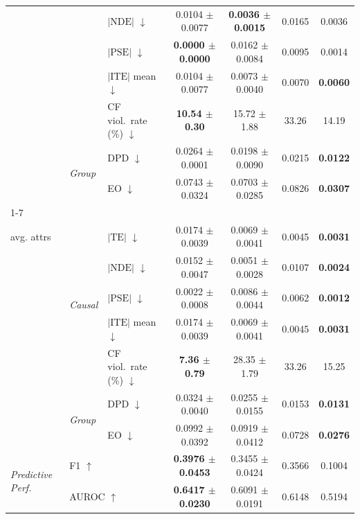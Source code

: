 \begin{table}[t]
\begin{tabular}{@{}lll cccc@{}}
  & & $|\mathrm{NDE}|$ $\downarrow$ & 0.0104 $\pm$ 0.0077 & \textbf{0.0036 $\pm$ 0.0015} & 0.0165 & 0.0036 \\
  & & $|\mathrm{PSE}|$ $\downarrow$ & \textbf{0.0000 $\pm$ 0.0000} & 0.0162 $\pm$ 0.0084 & 0.0095 & 0.0014 \\
  & & $|\mathrm{ITE}|$ mean $\downarrow$ & 0.0104 $\pm$ 0.0077 & 0.0073 $\pm$ 0.0040 & 0.0070 & \textbf{0.0060} \\
  & & CF viol.\ rate (\%) $\downarrow$ & \textbf{10.54 $\pm$ 0.30} & 15.72 $\pm$ 1.88 & 33.26 & 14.19 \\
  & \multirow{2}{*}{\scriptsize\textit{Group}} & DPD $\downarrow$ & 0.0264 $\pm$ 0.0001 & 0.0198 $\pm$ 0.0090 & 0.0215 & \textbf{0.0122} \\
  & & EO $\downarrow$ & 0.0743 $\pm$ 0.0324 & 0.0703 $\pm$ 0.0285 & 0.0826 & \textbf{0.0307} \\
\cmidrule(lr){1-7}
  \multirow{7}{*}{\makecell[l]{\textit{Overall}\\[-2pt]\scriptsize avg. attrs}} & \multirow{5}{*}{\scriptsize\textit{Causal}} & $|\mathrm{TE}|$ $\downarrow$ & 0.0174 $\pm$ 0.0039 & 0.0069 $\pm$ 0.0041 & 0.0045 & \textbf{0.0031} \\
  & & $|\mathrm{NDE}|$ $\downarrow$ & 0.0152 $\pm$ 0.0047 & 0.0051 $\pm$ 0.0028 & 0.0107 & \textbf{0.0024} \\
  & & $|\mathrm{PSE}|$ $\downarrow$ & 0.0022 $\pm$ 0.0008 & 0.0086 $\pm$ 0.0044 & 0.0062 & \textbf{0.0012} \\
  & & $|\mathrm{ITE}|$ mean $\downarrow$ & 0.0174 $\pm$ 0.0039 & 0.0069 $\pm$ 0.0041 & 0.0045 & \textbf{0.0031} \\
  & & CF viol.\ rate (\%) $\downarrow$ & \textbf{7.36 $\pm$ 0.79} & 28.35 $\pm$ 1.79 & 33.26 & 15.25 \\
  & \multirow{2}{*}{\scriptsize\textit{Group}} & DPD $\downarrow$ & 0.0324 $\pm$ 0.0040 & 0.0255 $\pm$ 0.0155 & 0.0153 & \textbf{0.0131} \\
  & & EO $\downarrow$ & 0.0992 $\pm$ 0.0392 & 0.0919 $\pm$ 0.0412 & 0.0728 & \textbf{0.0276} \\
\midrule
\multirow{2}{*}{\textit{Predictive Perf.}} & \multicolumn{2}{l}{F1 $\uparrow$} & \textbf{0.3976 $\pm$ 0.0453} & 0.3455 $\pm$ 0.0424 & 0.3566 & 0.1004 \\
  & \multicolumn{2}{l}{AUROC $\uparrow$} & \textbf{0.6417 $\pm$ 0.0230} & 0.6091 $\pm$ 0.0191 & 0.6148 & 0.5194 \\
\bottomrule
\end{tabular}
\end{table}